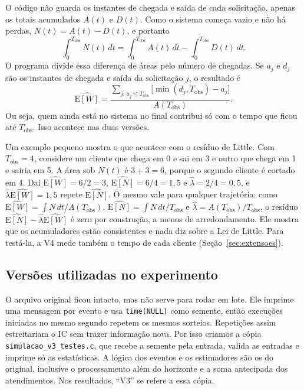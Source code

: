 \documentclass[
  article,      %
  10pt,         %
  oneside,
  a4paper,
  twocolumn,    %
  english,
  brazil        %
]{abntex2}
\newcommand{\EN}{\mathrm{E}[N]}
\newcommand{\EW}{\mathrm{E}[W]}
\begin{document}
O código não guarda os instantes de chegada e saída de cada solicitação, apenas os totais acumulados $A(t)$ e $D(t)$. Como o sistema começa vazio e não há perdas, $N(t)=A(t)-D(t)$, e portanto
\begin{equation}
  \int_0^{T_{\mathrm{obs}}} N(t)\,dt
  =\int_0^{T_{\mathrm{obs}}} A(t)\,dt
  -\int_0^{T_{\mathrm{obs}}} D(t)\,dt.
\end{equation}
O programa divide essa diferença de áreas pelo número de chegadas. Se $a_j$ e $d_j$ são os instantes de chegada e saída da solicitação $j$, o resultado é
\begin{equation}
  \widehat{\EW}=
  \frac{\sum_{j:\,a_j\leq T_{\mathrm{obs}}}
  \bigl[\min(d_j,T_{\mathrm{obs}})-a_j\bigr]}
  {A(T_{\mathrm{obs}})}.
  \label{eq:permanencia-truncada}
\end{equation}
Ou seja, quem ainda está no sistema no final contribui só com o tempo que ficou até $T_{\mathrm{obs}}$. Isso acontece nas duas versões.

Um exemplo pequeno mostra o que acontece com o resíduo de Little. Com $T_{\mathrm{obs}}=4$, considere um cliente que chega em 0 e sai em 3 e outro que chega em 1 e sairia em 5. A área sob $N(t)$ é $3+3=6$, porque o segundo cliente é cortado em 4. Daí $\widehat{\EW}=6/2=3$, $\widehat{\EN}=6/4=1{,}5$ e $\widehat{\lambda}=2/4=0{,}5$, e $\widehat{\lambda}\widehat{\EW}=1{,}5$ repete $\widehat{\EN}$. O mesmo vale para qualquer trajetória: como $\widehat{\EW}=\int N\,dt/A(T_{\mathrm{obs}})$, $\widehat{\EN}=\int N\,dt/T_{\mathrm{obs}}$ e $\widehat{\lambda}=A(T_{\mathrm{obs}})/T_{\mathrm{obs}}$, o resíduo $\widehat{\EN}-\widehat{\lambda}\widehat{\EW}$ é zero por construção, a menos de arredondamento. Ele mostra que os acumuladores estão consistentes e nada diz sobre a Lei de Little. Para testá-la, a V4 mede também o tempo de cada cliente (Seção~\ref{sec:extensoes}).

\subsection{Versões utilizadas no experimento}

O arquivo original ficou intacto, mas não serve para rodar em lote. Ele imprime uma mensagem por evento e usa \texttt{time(NULL)} como semente, então execuções iniciadas no mesmo segundo repetem os mesmos sorteios. Repetições assim estreitariam o IC sem trazer informação nova. Por isso criamos a cópia \texttt{simulacao\_v3\_testes.c}, que recebe a semente pela entrada, valida as entradas e imprime só as estatísticas. A lógica dos eventos e os estimadores são os do original, inclusive o processamento além do horizonte e a soma antecipada dos atendimentos. Nos resultados, ``V3'' se refere a essa cópia.
\end{document}
